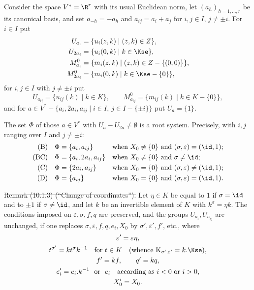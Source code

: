 \documentclass[12pt,a4paper,oneside,english]{smfart}
\theoremstyle{definition}
\theoremstyle{bt}
\begin{document}
Consider the space $V^{*}=\R^{r}$ with its usual Euclidean norm, let
$(a_h)_{h=1,\dots,r}$ be its canonical basis, and set $a_{-h}=-a_h$ and
$a_{ij}=a_i+a_j$ for $i,j\in I$, $j\neq\pm i$. For $i\in I$ put
\begin{align*}
U_{a_i}   &=\{u_i(z,k)\mid (z,k)\in Z\},\\
U_{2a_i}  &=\{u_i(0,k)\mid k\in\Kse\},\\
M^{0}_{a_i}  &=\{m_i(z,k)\mid (z,k)\in Z-\{(0,0)\}\},\\
M^{0}_{2a_i} &=\{m_i(0,k)\mid k\in\Kse-\{0\}\},
\end{align*}
for $i,j\in I$ with $j\neq\pm i$ put
\[
U_{a_{ij}}=\{u_{ij}(k)\mid k\in K\},\qquad M^{0}_{a_{ij}}=\{m_{ij}(k)\mid k\in K-\{0\}\},
\]
and for $a\in V^{*}-\{a_i,2a_i,a_{ij}\mid i\in I,\ j\in I-\{\pm i\}\}$ put
$U_a=\{1\}$.

The set $\Phi$ of those $a\in V^{*}$ with $U_a-U_{2a}\neq\emptyset$ is a root
system. Precisely, with $i,j$ ranging over $I$ and $j\neq\pm i$:
\begin{align*}
\text{(B)}\quad  &\Phi=\{a_i,a_{ij}\}      &&\text{when } X_0\neq\{0\}\text{ and }(\sigma,\varepsilon)=(\id,1);\\
\text{(BC)}\quad &\Phi=\{a_i,2a_i,a_{ij}\} &&\text{when } X_0\neq\{0\}\text{ and }\sigma\neq\id;\\
\text{(C)}\quad  &\Phi=\{2a_i,a_{ij}\}     &&\text{when } X_0=\{0\}\text{ and }(\sigma,\varepsilon)\neq(\id,1);\\
\text{(D)}\quad  &\Phi=\{a_{ij}\}          &&\text{when } X_0=\{0\}\text{ and }(\sigma,\varepsilon)=(\id,1).
\end{align*}

\st{Remark (10.1.3) (``Change of coordinates'').}
Let $\eta\in K$ be equal to $1$ if $\sigma=\id$ and to $\pm1$ if
$\sigma\neq\id$, and let $k$ be an invertible element of $K$ with
$k^{\sigma}=\eta k$. The conditions imposed on $\varepsilon,\sigma,f,q$ are
preserved, and the groups $U_{a_i},U_{a_{ij}}$ are unchanged, if one replaces
$\sigma,\varepsilon,f,q,e_i,X_0$ by $\sigma',\varepsilon',f'$, etc., where
\begin{gather*}
\varepsilon'=\varepsilon\eta,\\
t^{\sigma'}=kt^{\sigma}k^{-1}\quad\text{for } t\in K
 \quad(\text{whence } \mathrm{K}_{\sigma',\varepsilon'}=k.\Kse),\\
f'=kf,\qquad q'=kq,\\
e_i'=e_i.k^{-1}\ \text{ or }\ e_i \quad\text{according as } i<0 \text{ or } i>0,\\
X_0'=X_0 .
\end{gather*}
\end{document}
